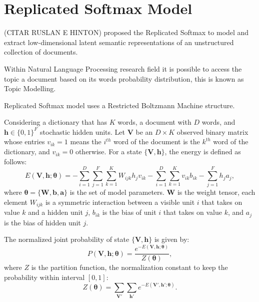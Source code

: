 \section{Replicated Softmax Model}%
\label{app:rsm}%

(CITAR RUSLAN E HINTON) proposed the Replicated Softmax to model and extract low-dimensional latent semantic representations of an unstructured collection of documents.

Within Natural Language Processing research field it is possible to access the topic a document based on its words probability distribution, this is known as Topic Modelling.

Replicated Softmax model uses a Restricted Boltzmann Machine structure.

Considering a dictionary that has $K$ words, a document with $D$ words, and $\mathbf{h} \in {\{0, 1\}}^{F}$ stochastic hidden units.
Let $\mathbf{V}$ be an $D \times K$ observed binary matrix whose entries $v_{ik} = 1$ means the $i^{th}$ word of the document is the $k^{th}$ word of the dictionary, and $v_{ik} = 0$ otherwise.
For a state ${\{\mathbf{V}, \mathbf{h}\}}$, the energy is defined as follows:
\begin{equation}
    \label{eq:app:rsm-energy-Vh}
    E(\mathbf{V}, \mathbf{h}; \bm{\theta}) = - \sum^{D}_{i = 1} \sum^{F}_{j = 1} \sum^{K}_{k = 1} W_{ijk} h_{j} v_{ik} - \sum^{D}_{i = 1} \sum^{K}_{k = 1} v_{ik} b_{ik} - \sum^{F}_{j = 1} h_{j} a_{j},
\end{equation}
where $\bm{\theta} = \{\mathbf{W}, \mathbf{b}, \mathbf{a}\}$ is the set of model parameters.
$\mathbf{W}$ is the weight tensor, each element $W_{ijk}$ is a symmetric interaction between a visible unit $i$ that takes on value $k$ and a hidden unit $j$, $b_{ik}$ is the bias of unit $i$ that takes on value $k$, and $a_{j}$ is the bias of hidden unit $j$.

The normalized joint probability of state ${\{\mathbf{V}, \mathbf{h}\}}$ is given by:
\begin{equation}
    \label{eq:app:rsm-joint-prob}
    P(\mathbf{V}, \mathbf{h}; \bm{\theta}) = \frac{e^{-E(\mathbf{V}, \mathbf{h}; \bm{\theta})}}{Z(\bm{\theta})},
\end{equation}
where $Z$ is the partition function, the normalization constant to keep the probability within interval $[0, 1]$:
\begin{equation}
    \label{eq:app:rsm-partition-func}
    Z(\bm{\theta}) = \sum_{\mathbf{V}'} \sum_{\mathbf{h}'} e^{-E(\mathbf{V}', \mathbf{h}'; \bm{\theta})}.
\end{equation}

